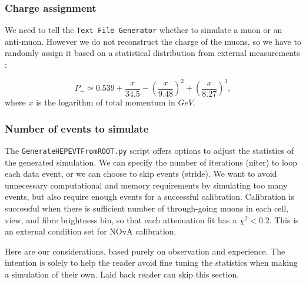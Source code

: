 \documentclass[12pt]{article}
\begin{document}
\subsubsection{Charge assignment}
We need to tell the \texttt{Text File Generator} whether to simulate a muon or an anti-muon. However we do not reconstruct the charge of the muons, so we have to randomly assign it based on a statistical distribution from external measurements \cite{NOVA-doc-51327-v3}:


\begin{equation}
P_+ \simeq 0.539 + \frac{x}{34.5}-\left(\frac{x}{9.48}\right)^2 + \left(\frac{x}{8.27}\right)^3,
\end{equation}
where $x$ is the logarithm of total momentum in $\unit{GeV}$.

\subsubsection{Number of events to simulate}\label{secNumEvents}
The \texttt{GenerateHEPEVTFromROOT.py} script offers options to adjust the statistics of the generated simulation. We can specify the number of iterations (niter) to loop each data event, or we can choose to skip events (stride). We want to avoid unnecessary computational and memory requirements by simulating too many events, but also require enough events for a successful calibration. Calibration is successful when there is sufficient number of through-going muons in each cell, view, and fibre brightness bin, so that each attenuation fit has a $\chi^2<0.2$. This is an external condition set for NOvA calibration.

Here are our considerations, based purely on observation and experience. The intention is solely to help the reader avoid fine tuning the statistics when making a simulation of their own. Laid back reader can skip this section.
\end{document}
